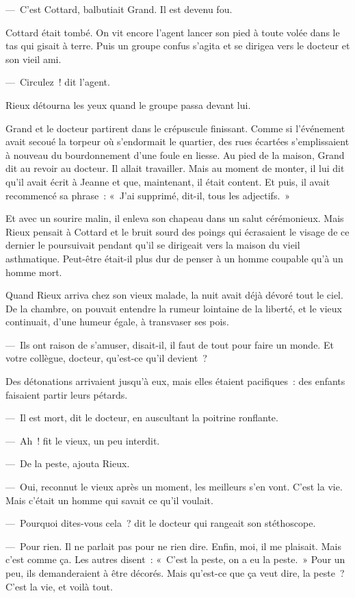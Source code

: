 \documentclass[french,twoside]{book} %
\begin{document}
— C’est Cottard, balbutiait Grand. Il est devenu fou.\par
Cottard était tombé. On vit encore l’agent lancer son pied à toute volée dans le tas qui gisait à terre. Puis un groupe confus s’agita et se dirigea vers le docteur et son vieil ami.\par
— Circulez ! dit l’agent.\par
Rieux détourna les yeux quand le groupe passa devant lui.\par
Grand et le docteur partirent dans le crépuscule finissant. Comme si l’événement avait secoué la torpeur où s’endormait le quartier, des rues écartées s’emplissaient à nouveau du bourdonnement d’une foule en liesse. Au pied de la maison, Grand dit au revoir au docteur. Il allait travailler. Mais au moment de monter, il lui dit qu’il avait écrit à Jeanne et que, maintenant, il était content. Et puis, il avait recommencé sa phrase : « J’ai supprimé, dit-il, tous les adjectifs. »\par
Et avec un sourire malin, il enleva son chapeau dans un salut cérémonieux. Mais Rieux pensait à Cottard et le bruit sourd des poings qui écrasaient le visage de ce dernier le poursuivait pendant qu’il se dirigeait vers la maison du vieil asthmatique. Peut-être était-il plus dur de penser à un homme coupable qu’à un homme mort.\par
Quand Rieux arriva chez son vieux malade, la nuit avait déjà dévoré tout le ciel. De la chambre, on pouvait entendre la rumeur lointaine de la liberté, et le vieux continuait, d’une humeur égale, à transvaser ses pois.\par
— Ils ont raison de s’amuser, disait-il, il faut de tout pour faire un monde. Et votre collègue, docteur, qu’est-ce qu’il devient ?\par
Des détonations arrivaient jusqu’à eux, mais elles étaient pacifiques : des enfants faisaient partir leurs pétards.\par
— Il est mort, dit le docteur, en auscultant la poitrine ronflante.\par
— Ah ! fit le vieux, un peu interdit.\par
— De la peste, ajouta Rieux.\par
— Oui, reconnut le vieux après un moment, les meilleurs s’en vont. C’est la vie. Mais c’était un homme qui savait ce qu’il voulait.\par
— Pourquoi dites-vous cela ? dit le docteur qui rangeait son stéthoscope.\par
— Pour rien. Il ne parlait pas pour ne rien dire. Enfin, moi, il me plaisait. Mais c’est comme ça. Les autres disent : « C’est la peste, on a eu la peste. » Pour un peu, ils demanderaient à être décorés. Mais qu’est-ce que ça veut dire, la peste ? C’est la vie, et voilà tout.\par
\end{document}
